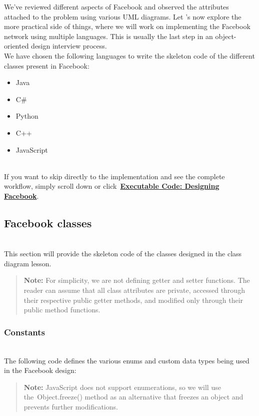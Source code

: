 

We've reviewed different aspects of Facebook and observed the attributes attached to the problem using various UML diagrams. Let 's now explore the more practical side of things, where we will work on implementing the Facebook network using multiple languages. This is usually the last step in an object-oriented design interview process.
\\
We have chosen the following languages to write the skeleton code of the different classes present in Facebook:

\begin{itemize}
\item
\protect{}\label{5MVwykRUFoN83F8hjfrIV}
Java
\item
\protect{}\label{O_lrk-etWKbAomEfDOhDs}
C\#
\item
\protect{}\label{hg2Ag9Odig9jdmzIitaXe}
Python
\item
\protect{}\label{YcINEV55e4BpyhFL55GKh}
C++
\item
\protect{}\label{Wao1TLm3Z1PN3Yh4iOhhI}
JavaScript
\end{itemize}
\\
If you want to skip directly to the implementation and see the complete workflow, simply scroll down or click~\hyperref[Executable-code-Designing-Facebook]{\textbf{Executable Code: Designing Facebook}}.

\subsection{Facebook classes}\label{6op16HCX1YKgipH7RhBSS}
\\
This section will provide the skeleton code of the classes designed in the class diagram lesson.
\begin{quote}
\textbf{Note:} For simplicity, we are not defining getter and setter functions. The reader can assume that all class attributes are private, accessed through their respective public getter methods, and modified only through their public method functions.
\end{quote}
\subsubsection{Constants}\label{MU_WZCHV_OmUt6XAQ4iWW}
\\
The following code defines the various enums and custom data types being used in the Facebook design:
\begin{quote}
\textbf{Note:} JavaScript does not support enumerations, so we will use the\ Object.freeze() method as an alternative that freezes an object and prevents further modifications.
\end{quote}

